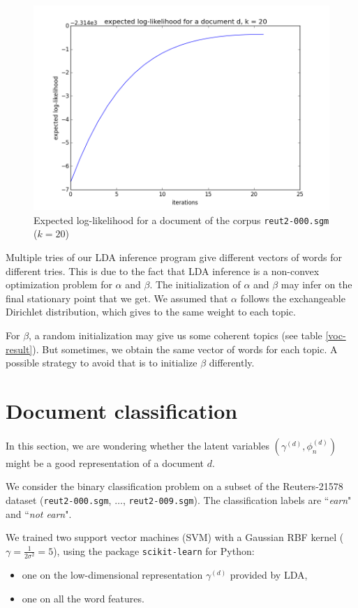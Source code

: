 \documentclass{article}
\begin{document}
\begin{figure}[ht!]
\begin{center}
\includegraphics[width=0.5\linewidth]{../img/k=20/log_likelihood_document_k=20.png}
\caption{Expected log-likelihood for a document of the corpus \texttt{reut2-000.sgm} ($k=20$)}
\label{log-likelihood-doc}
\end{center}
\end{figure}

Multiple tries of our LDA inference program give different vectors of words for different tries. This is due to the fact that LDA inference is a non-convex optimization problem for $\alpha$ and $\beta$. The initialization of $\alpha$ and $\beta$ may infer on the final  stationary point that we get. We assumed that $\alpha$ follows the exchangeable Dirichlet distribution, which gives to the same weight to each topic.  

For $\beta$, a random initialization may give us some coherent topics (see table \ref{voc-result}). But sometimes, we obtain the same vector of words for each topic. A possible strategy to avoid that is to initialize $\beta$ differently.

\section{Document classification}

In this section, we are wondering whether the latent variables $(\gamma^{(d)}, \phi_n^{(d)})$ might be a good representation of a document $d$.

We consider the binary classification problem on a subset of the Reuters-21578 dataset (\texttt{reut2-000.sgm}, $\ldots$, \texttt{reut2-009.sgm}). The classification labels are ``\emph{earn}" and ``\emph{not earn}".


We trained two support vector machines (SVM) with a Gaussian RBF kernel ($\gamma= \frac{1}{2\sigma^2}=5$), using the package \texttt{scikit-learn} for Python:
\begin{itemize}
  \item one on the low-dimensional representation $\gamma^{(d)}$ provided by LDA,
  \item one on all the word features.
\end{itemize}
\end{document}
